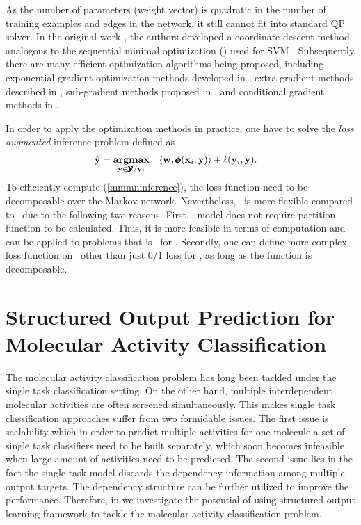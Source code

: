 {As the number of parameters (weight vector) is quadratic in the number of training examples and edges in the network, it still cannot fit into standard QP solver. 
In the original work \citep{Taskar04max}, the authors developed a coordinate descent method analogous to the sequential minimal optimization (\smo) used for SVM \citep{Platt98sequential,Platt99fast}.
Subsequently, there are many efficient optimization algorithms being proposed, including exponential gradient optimization methods developed in \citep{bartlett04}, extra-gradient methods described in \citep{taskar06}, sub-gradient methods proposed in \citep{Ratliff07}, and conditional gradient methods in \citep{rousu06, rousu07}.

In order to apply the optimization methods in practice, one have to solve the \textit{loss augmented} inference problem defined as
\begin{align}
	\hat{\mathbf {y}} = \underset{\mathbf {y}\in\pmb {\mathcal{Y}}/\mathbf {y}_i}{\textbf{argmax}} &\quad \langle \mathbf {w}, \pmb \phi(\mathbf {x}_i,\mathbf {y}) \rangle + \mathbf {\ell}(\mathbf {y}_i,\mathbf {y}) \label{mmmninference}.
\end{align} 
To efficiently compute (\ref{mmmninference}), the loss function need to be decomposable over the Markov network.
Nevertheless, \mmmn\ is more flexible compared to \crf\ due to the following two reasons.
First, \mmmn\ model does not require partition function to be calculated. 
Thus, it is more feasible in terms of computation and can be applied to problems that is \nphard\ for \crf.
Secondly, one can define more complex loss function on \mmmn\ other than just 0/1 loss for \crf, as long as the function is decomposable.


\section{Structured Output Prediction for Molecular Activity Classification}\label{sc_su10}

The molecular activity classification problem has long been tackled under the single task classification setting.
On the other hand, multiple interdependent molecular activities are often screened simultaneously.
This makes single task classification approaches suffer from two formidable issues.
The first issue is scalability which in order to predict multiple activities for one molecule a set of single task classifiers need to be built separately, which soon becomes infeasible when large amount of activities need to be predicted.
The second issue lies in the fact the single task model discards the dependency information among multiple output targets.
The dependency structure can be further utilized to improve the performance.
Therefore, in  we investigate the potential of using structured output learning framework to tackle the molecular activity classification problem.


}

